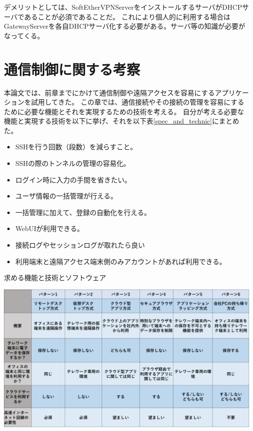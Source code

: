 \documentclass[11pt,a4j,titlepage]{jreport}
\begin{document}
デメリットとしては、SoftEtherVPNServerをインストールするサーバがDHCPサーバであることが必須であることだ。
これにより個人的に利用する場合はGatewayServerを各自DHCPサーバ化する必要がある。サーバ等の知識が必要がなってくる。





\chapter{通信制御に関する考察}

本論文では、前章までにかけて通信制御や遠隔アクセスを容易にするアプリケーションを試用してきた。
この章では、通信接続やその接続の管理を容易にするために必要な機能とそれを実現するための技術を考える。
自分が考える必要な機能と実現する技術を以下に挙げ、それを以下表\ref{spec_and_technic}にまとめた。

\begin{itemize}
    \setlength{\parskip}{0.1cm} %
    \setlength{\itemsep}{0.1cm} 
    \item SSHを行う回数（段数）を減らすこと。
    \item SSHの際のトンネルの管理の容易化。%
    \item ログイン時に入力の手間を省きたい。%
    \item ユーザ情報の一括管理が行える。%
    \item 一括管理に加えて、登録の自動化を行える。
    \item WebUIが利用できる。
    \item 接続ログやセッションログが取れたら良い
    \item 利用端末と遠隔アクセス端末側のみアカウントがあれば利用できる。%
\end{itemize}

\begin{table}[h]
    \caption{求める機能と技術とソフトウェア}
    \centering
    \includegraphics*[width=1.0\textwidth,page=8]{graphs/telework_list.pdf}
    \label{spec_and_technic}
\end{table}
\end{document}
